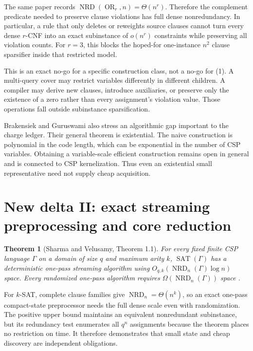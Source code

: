 \documentclass[11pt]{article}
\newtheorem{theorem}{Theorem}
\newcommand{\SAT}{\operatorname{SAT}}
\begin{document}
The same paper records
$\operatorname{NRD}(\operatorname{OR}_r,n)=\Theta(n^r)$.  Therefore the
complement predicate needed to preserve clause violations has full dense
nonredundancy.  In particular, a rule that only deletes or reweights source
clauses cannot turn every dense $r$-CNF into an exact subinstance of
$o(n^r)$ constraints while preserving all violation counts.  For $r=3$,
this blocks the hoped-for one-instance $n^2$ clause sparsifier inside that
restricted model.

This is an exact no-go for a specific construction class, not a no-go for
(1).  A multi-query cover may restrict variables differently in different
children.  A compiler may derive new clauses, introduce auxiliaries, or
preserve only the existence of a zero rather than every assignment's
violation value.  Those operations fall outside subinstance
sparsification.

Brakensiek and Guruswami also stress an algorithmic gap important to the
charge ledger.  Their general theorem is existential.  The naive
construction is polynomial in the code length, which can be exponential in
the number of CSP variables.  Obtaining a variable-scale efficient
construction remains open in general and is connected to CSP kernelization.
Thus even an existential small representative need not supply cheap
acquisition.

\section{New delta II: exact streaming preprocessing and core reduction}

\begin{theorem}[Sharma and Velusamy, Theorem 1.1]
For every fixed finite CSP language $\Gamma$ on a domain of size $q$ and
maximum arity $k$, $\SAT(\Gamma)$ has a deterministic one-pass streaming
algorithm using
$O_{q,k}(\operatorname{NRD}_n(\Gamma)\log n)$ space.  Every randomized
one-pass algorithm requires
$\Omega(\operatorname{NRD}_n(\Gamma))$ space
\cite{sharmavelusamy2026}.
\end{theorem}

For $k$-SAT, complete clause families give
$\operatorname{NRD}_n=\Theta(n^k)$, so an exact one-pass compact-state
preprocessor needs the full dense scale even with randomization.  The
positive upper bound maintains an equivalent nonredundant subinstance, but
its redundancy test enumerates all $q^n$ assignments because the theorem
places no restriction on time.  It therefore demonstrates that small state
and cheap discovery are independent obligations.
\end{document}
